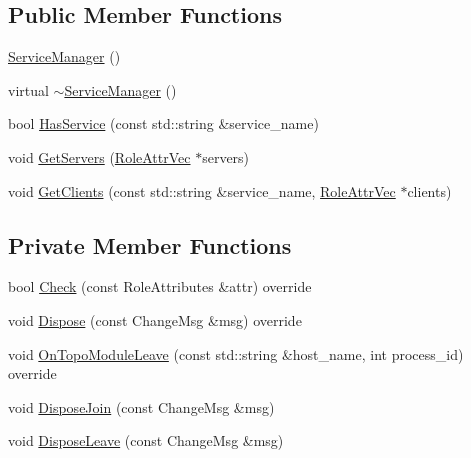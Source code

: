 \subsection*{Public Member Functions}
\begin{DoxyCompactItemize}
\item 
\hyperlink{classapollo_1_1cyber_1_1service__discovery_1_1ServiceManager_aa4ccadb8e7aace23d6c02031f460a90d}{Service\-Manager} ()
\item 
virtual \hyperlink{classapollo_1_1cyber_1_1service__discovery_1_1ServiceManager_a658db5d81844d87269d285ef2fb364fe}{$\sim$\-Service\-Manager} ()
\item 
bool \hyperlink{classapollo_1_1cyber_1_1service__discovery_1_1ServiceManager_a12024c4c93e51ad067f94bdc0591a8c3}{Has\-Service} (const std\-::string \&service\-\_\-name)
\item 
void \hyperlink{classapollo_1_1cyber_1_1service__discovery_1_1ServiceManager_af38ca75ea50d5e1bdd40b4cbb6c5f7d1}{Get\-Servers} (\hyperlink{classapollo_1_1cyber_1_1service__discovery_1_1ServiceManager_a1174fd4b721d2e18eb30b9e1530109b1}{Role\-Attr\-Vec} $\ast$servers)
\item 
void \hyperlink{classapollo_1_1cyber_1_1service__discovery_1_1ServiceManager_a97196cc509625f9fd5376043f4381bb3}{Get\-Clients} (const std\-::string \&service\-\_\-name, \hyperlink{classapollo_1_1cyber_1_1service__discovery_1_1ServiceManager_a1174fd4b721d2e18eb30b9e1530109b1}{Role\-Attr\-Vec} $\ast$clients)
\end{DoxyCompactItemize}
\subsection*{Private Member Functions}
\begin{DoxyCompactItemize}
\item 
bool \hyperlink{classapollo_1_1cyber_1_1service__discovery_1_1ServiceManager_aba4d8350c1f20a9b07084a714fe87428}{Check} (const Role\-Attributes \&attr) override
\item 
void \hyperlink{classapollo_1_1cyber_1_1service__discovery_1_1ServiceManager_a8a1117b41cc2e7f5620ad62639fb0fe8}{Dispose} (const Change\-Msg \&msg) override
\item 
void \hyperlink{classapollo_1_1cyber_1_1service__discovery_1_1ServiceManager_a1b154f0679b49c2ee378f8d7e591b222}{On\-Topo\-Module\-Leave} (const std\-::string \&host\-\_\-name, int process\-\_\-id) override
\item 
void \hyperlink{classapollo_1_1cyber_1_1service__discovery_1_1ServiceManager_a42cbaad2583152fd8e75f3c26580ea9e}{Dispose\-Join} (const Change\-Msg \&msg)
\item 
void \hyperlink{classapollo_1_1cyber_1_1service__discovery_1_1ServiceManager_ad3b28db1ef69252f7de78392d6d3d74d}{Dispose\-Leave} (const Change\-Msg \&msg)
\end{DoxyCompactItemize}
